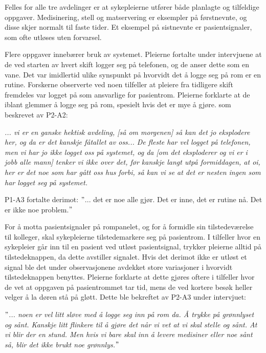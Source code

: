 \noindent
Felles for alle tre avdelinger er at sykepleierne utfører både planlagte og tilfeldige oppgaver. Medisinering, stell og matservering er eksempler på førstnevnte, og disse skjer normalt til faste tider. Et eksempel på sistnevnte er pasientsignaler, som ofte utløses uten forvarsel.  

\noindent
Flere oppgaver innebærer bruk av systemet. Pleierne fortalte under intervjuene at de ved starten av hvert skift logger seg på telefonen, og de anser dette som en vane. Det var imidlertid ulike synspunkt på hvorvidt det å logge seg på rom er en rutine. Forskerne observerte ved noen tilfeller at pleiere fra tidligere skift fremdeles var logget på som ansvarlige for pasientrom. Pleierne forklarte at de iblant glemmer å logge seg på rom, spesielt hvis det er mye å gjøre. som beskrevet av P2-A2:

\noindent
\textit{... vi er en ganske hektisk avdeling, [så om morgenen] så kan det jo eksplodere her, og da er det kanskje fåtallet av oss... De fleste har vel logget på telefonen, men vi har jo ikke logget oss på systemet, og da [om det eksploderer og vi er i jobb alle mann] tenker vi ikke over det, før kanskje langt utpå formiddagen, at oi, her er det noe som har gått oss hus forbi, så kan vi se at det er nesten ingen som har logget seg på systemet.}

\noindent
P1-A3 fortalte derimot: $"$... det er noe alle gjør. Det er inne, det er rutine nå. Det er ikke noe problem.$"$ 

\noindent
For å motta pasientsignaler på rompanelet, og for å formidle sin tilstedeværelse til kolleger, skal sykepleierne tilstedemarkere seg på pasientrom. I tilfeller hvor en sykepleier går inn til en pasient ved utløst pasientsignal, trykker pleierne alltid på tilstedeknappen, da dette avstiller signalet. Hvis det derimot ikke er utløst et signal ble det under observasjonene avdekket store variasjoner i hvorvidt tilstedeknappen benyttes. Pleierne forklarte at dette gjøres oftere i tilfeller hvor de vet at oppgaven på pasientrommet tar tid, mens de ved kortere besøk heller velger å la døren stå på gløtt. Dette ble bekreftet av P2-A3 under intervjuet: 

\noindent
\textit{$"$... noen er vel litt sløve med å logge seg inn på rom da. Å trykke på grønnlyset og sånt. Kanskje litt flinkere til å gjøre det når vi vet at vi skal stelle og sånt. At vi blir der en stund. Men hvis vi bare skal inn å levere medisiner eller noe sånt så, blir det ikke brukt noe grønnlys.$"$}

